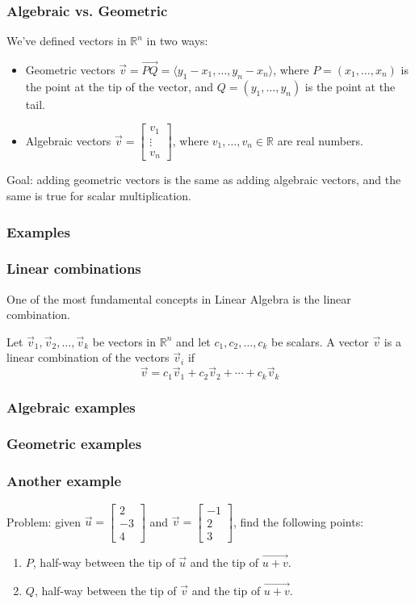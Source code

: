\documentclass[11pt,t]{beamer}
\newcommand{\R}{\mathbb{R}}
\begin{document}
\begin{frame}\frametitle{Algebraic vs. Geometric}
 We've defined vectors in $\R^n$ in two ways:
\begin{itemize}
 \item Geometric vectors $\vec{v}=\overrightarrow{PQ} = \langle y_1-x_1,\ldots, y_n-x_n\rangle$, where $P=(x_1,\ldots, x_n)$ is the point at the tip of the vector, and $Q=(y_1,\ldots, y_n)$ is the point at the tail.
 \item Algebraic vectors $\vec{v} = \begin{bmatrix}v_1\\\vdots\\v_n\end{bmatrix}$, where $v_1,\ldots, v_n\in \R$ are real numbers.
\end{itemize}
Goal: adding geometric vectors is the same as adding algebraic vectors, and the same is true for scalar multiplication.
\end{frame}
\begin{frame}\frametitle{Examples}
 
\end{frame}
\begin{frame}\frametitle{Linear combinations}
 One of the most fundamental concepts in Linear Algebra is the \alert{linear combination}.

 Let $\vec{v}_1,\vec{v}_2,\ldots,\vec{v}_k$ be vectors in $\R^n$ and let $c_1, c_2, \ldots, c_k$ be scalars. A vector $\vec{v}$ is a linear combination of the vectors $\vec{v}_i$ if
\[
 \vec{v} = c_1\vec{v}_1+c_2\vec{v}_2+\cdots + c_k\vec{v}_k
\]

\end{frame}
\begin{frame}\frametitle{Algebraic examples}
 
\end{frame}
\begin{frame}\frametitle{Geometric examples}
 
\end{frame}
\begin{frame}\frametitle{Another example}
 \alert{Problem:} given $\vec{u} = \begin{bmatrix}2\\-3\\4\end{bmatrix}$ and $\vec{v} = \begin{bmatrix}-1\\2\\3\end{bmatrix}$, find the following points:
\begin{enumerate}
 \item $P$, half-way between the tip of $\vec{u}$ and the tip of $\vec{u+v}$.
 \item $Q$, half-way between the tip of $\vec{v}$ and the tip of $\vec{u+v}$.
\end{enumerate}

\end{frame}
\end{document}
